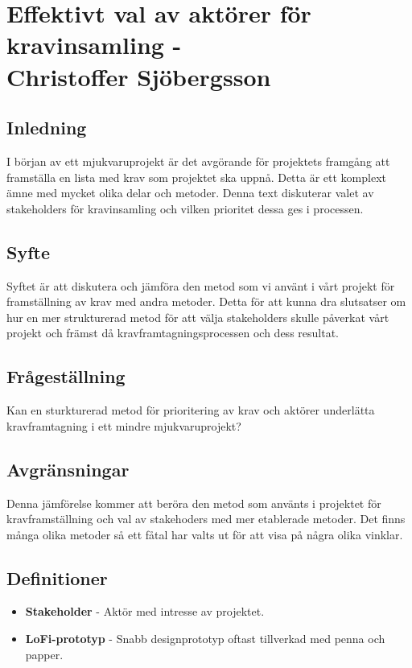 \chapter{Effektivt val av aktörer för \\kravinsamling - \\ Christoffer Sjöbergsson}

\section{Inledning}
I början av ett mjukvaruprojekt är det avgörande för projektets framgång att framställa en lista med krav som projektet ska uppnå. Detta är ett komplext ämne med mycket olika delar och metoder. Denna text diskuterar valet av stakeholders för kravinsamling och vilken prioritet dessa ges i processen.

\section{Syfte}
Syftet är att diskutera och jämföra den metod som vi använt i vårt projekt för framställning av krav med andra metoder. Detta för att kunna dra slutsatser om hur en mer strukturerad metod för att välja stakeholders skulle påverkat vårt projekt och främst då kravframtagningsprocessen och dess resultat.

\section{Frågeställning}
Kan en sturkturerad metod för prioritering av krav och aktörer underlätta kravframtagning i ett mindre mjukvaruprojekt?

\section{Avgränsningar}
Denna jämförelse kommer att beröra den metod som använts i projektet för kravframställning och val av stakehoders med mer etablerade metoder. Det finns många olika metoder så ett fåtal har valts ut för att visa på några olika vinklar.

\section{Definitioner}
\begin{itemize}
	\item \textbf{Stakeholder} - Aktör med intresse av projektet.
	\item \textbf{LoFi-prototyp} - Snabb designprototyp oftast tillverkad med penna och papper.
\end{itemize}


